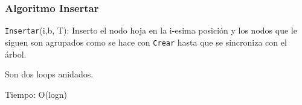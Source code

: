\documentclass[10pt,handout]{beamer}
\begin{document}
\begin{frame}
  \pause

\end{frame}


\begin{frame}
\frametitle{Algoritmo Insertar}
  \texttt{Insertar}(i,b, T): Inserto el nodo hoja en la i-esima posición y los nodos que le siguen son agrupados
  como se hace con  \texttt{Crear} hasta que se sincroniza con el árbol.

  Son dos loops anidados.

  Tiempo: O(logn)
\end{frame}



\end{document}
